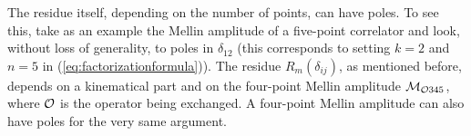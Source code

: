 The residue itself, depending on the number of points, can have poles. To see this,  take as an example the Mellin amplitude of a five-point correlator and look, without loss of generality, to poles in $\delta_{12}$ (this corresponds to setting $k=2$ and $n=5$ in (\ref{eq:factorizationformula})). The residue $R_m(\delta_{ij})$, as mentioned before, depends on a kinematical part and on the four-point Mellin amplitude $\mathcal{M}_{{\cal O}345}$, where ${\cal O}$ is the operator being exchanged. A four-point Mellin amplitude can also have poles for the very same argument.
\begin{figure}[t!]
  \centering




\end{figure}
